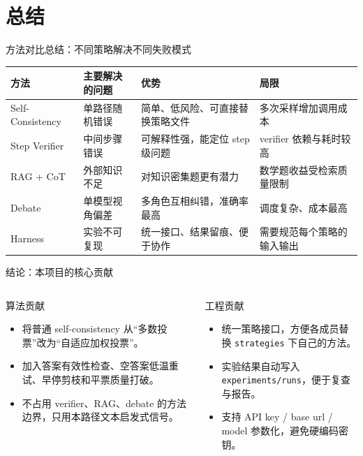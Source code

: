 \documentclass[10pt,aspectratio=169]{beamer}
\newcommand{\tightitems}{\setlength{\itemsep}{0.24em}}
\begin{document}
\section{总结}

\begin{frame}{方法对比总结：不同策略解决不同失败模式}
  \small
  \begin{tabularx}{\linewidth}{lYYY}
    \toprule
    方法 & 主要解决的问题 & 优势 & 局限 \\
    \midrule
    Self-Consistency & 单路径随机错误 & 简单、低风险、可直接替换策略文件 & 多次采样增加调用成本 \\
    Step Verifier & 中间步骤错误 & 可解释性强，能定位 step 级问题 & verifier 依赖与耗时较高 \\
    RAG + CoT & 外部知识不足 & 对知识密集题更有潜力 & 数学题收益受检索质量限制 \\
    Debate & 单模型视角偏差 & 多角色互相纠错，准确率最高 & 调度复杂、成本最高 \\
    Harness & 实验不可复现 & 统一接口、结果留痕、便于协作 & 需要规范每个策略的输入输出 \\
    \bottomrule
  \end{tabularx}
\end{frame}

\begin{frame}{结论：本项目的核心贡献}
  \begin{columns}[T,onlytextwidth]
    \begin{column}{0.49\textwidth}
      \begin{block}{算法贡献}
        \begin{itemize}
          \tightitems
          \item 将普通 self-consistency 从“多数投票”改为“自适应加权投票”。
          \item 加入答案有效性检查、空答案低温重试、早停剪枝和平票质量打破。
          \item 不占用 verifier、RAG、debate 的方法边界，只用本路径文本启发式信号。
        \end{itemize}
      \end{block}
    \end{column}
    \begin{column}{0.47\textwidth}
      \begin{block}{工程贡献}
        \begin{itemize}
          \tightitems
          \item 统一策略接口，方便各成员替换 \texttt{strategies} 下自己的方法。
          \item 实验结果自动写入 \texttt{experiments/runs}，便于复查与报告。
          \item 支持 API key / base url / model 参数化，避免硬编码密钥。
        \end{itemize}
      \end{block}
    \end{column}
  \end{columns}
\end{frame}
\end{document}
